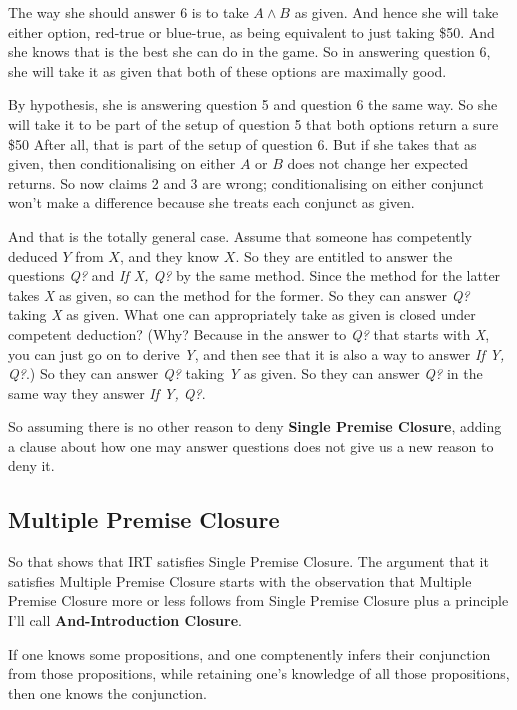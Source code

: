 \documentclass[11pt,]{book}
\providecommand{\tightlist}{%
  \setlength{\itemsep}{0pt}\setlength{\parskip}{0pt}}
\begin{document}
The way she should answer 6 is to take \(A \wedge B\) as given. And hence she will take either option, red-true or blue-true, as being equivalent to just taking \$50. And she knows that is the best she can do in the game. So in answering question 6, she will take it as given that both of these options are maximally good.

By hypothesis, she is answering question 5 and question 6 the same way. So she will take it to be part of the setup of question 5 that both options return a sure \$50 After all, that is part of the setup of question 6. But if she takes that as given, then conditionalising on either \(A\) or \(B\) does not change her expected returns. So now claims 2 and 3 are wrong; conditionalising on either conjunct won't make a difference because she treats each conjunct as given.

And that is the totally general case. Assume that someone has competently deduced \(Y\) from \(X\), and they know \(X\). So they are entitled to answer the questions \emph{Q?} and \emph{If X, Q?} by the same method. Since the method for the latter takes \emph{X} as given, so can the method for the former. So they can answer \emph{Q?} taking \emph{X} as given. What one can appropriately take as given is closed under competent deduction? (Why? Because in the answer to \emph{Q?} that starts with \emph{X}, you can just go on to derive \emph{Y}, and then see that it is also a way to answer \emph{If Y, Q?}.) So they can answer \emph{Q?} taking \emph{Y} as given. So they can answer \emph{Q?} in the same way they answer \emph{If Y, Q?}.

So assuming there is no other reason to deny \textbf{Single Premise Closure}, adding a clause about how one may answer questions does not give us a new reason to deny it.

\hypertarget{andintro}{%
\subsection{Multiple Premise Closure}\label{andintro}}

So that shows that IRT satisfies Single Premise Closure. The argument that it satisfies Multiple Premise Closure starts with the observation that Multiple Premise Closure more or less follows from Single Premise Closure plus a principle I'll call \textbf{And-Introduction Closure}.

\begin{description}
\tightlist
\item[And-Introduction Closure]
If one knows some propositions, and one comptenently infers their conjunction from those propositions, while retaining one's knowledge of all those propositions, then one knows the conjunction.
\end{description}
\end{document}

